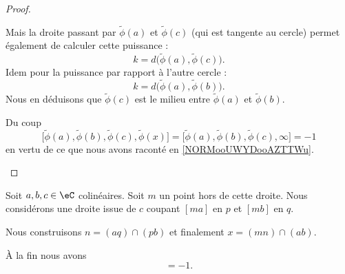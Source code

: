 \begin{proof}
\begin{subproof}
            Mais la droite passant par \( \tilde \phi(a)\) et \( \tilde \phi(c)\) (qui est tangente au cercle) permet également de calculer cette puissance :
            \begin{equation}
                k=d\big( \tilde \phi(a),\tilde \phi(c) \big).
            \end{equation}
            Idem pour la puissance par rapport à l'autre cercle :
            \begin{equation}
                k=d\big( \tilde \phi(a),\tilde \phi(b) \big).
            \end{equation}
            Nous en déduisons que \( \tilde \phi(c)\) est le milieu entre \( \tilde \phi(a)\) et \( \tilde \phi(b)\).

            Du coup
            \begin{equation}
                \big[ \tilde \phi(a),\tilde \phi(b), \tilde \phi(c),\tilde \phi(x) \big]=\big[ \tilde \phi(a),\tilde \phi(b), \tilde \phi(c), \infty \big]=-1
            \end{equation}
            en vertu de ce que nous avons raconté en \ref{NORMooUWYDooAZTTWu}.

    \end{subproof}
\end{proof}

\begin{lemma}        \label{LEMooYBTHooABWkeo}
    Soit \( a,b,c\in \eC\) colinéaires. Soit \( m\) un point hors de cette droite. Nous considérons une droite issue de \( c\) coupant \( [ma]\) en \( p\) et \( [mb] \) en \( q\).

    Nous construisons \( n=(aq)\cap (pb)\) et finalement \( x=(mn)\cap (ab)\).

    À la fin nous avons
    \begin{equation}
        [a,b,c,x]=-1.
    \end{equation}
\end{lemma}

